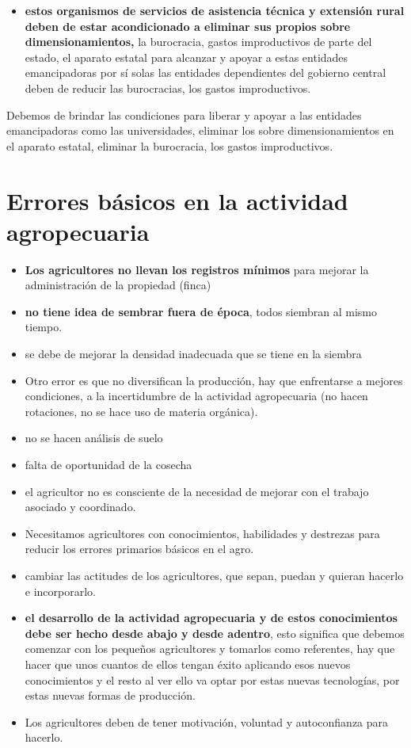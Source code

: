 \documentclass[
  a4paper,
]{article}
\providecommand{\tightlist}{%
  \setlength{\itemsep}{0pt}\setlength{\parskip}{0pt}}\usepackage{longtable,booktabs,array}
\begin{document}
\begin{itemize}
\tightlist
\item
  \textbf{estos organismos de servicios de asistencia técnica y
  extensión rural deben de estar acondicionado a eliminar sus propios
  sobre dimensionamientos,} la burocracia, gastos improductivos de parte
  del estado, el aparato estatal para alcanzar y apoyar a estas
  entidades emancipadoras por sí solas las entidades dependientes del
  gobierno central deben de reducir las burocracias, los gastos
  improductivos.
\end{itemize}

Debemos de brindar las condiciones para liberar y apoyar a las entidades
emancipadoras como las universidades, eliminar los sobre
dimensionamientos en el aparato estatal, eliminar la burocracia, los
gastos improductivos.

\hypertarget{errores-buxe1sicos-en-la-actividad-agropecuaria}{%
\section{Errores básicos en la actividad
agropecuaria}\label{errores-buxe1sicos-en-la-actividad-agropecuaria}}

\begin{itemize}
\item
  \textbf{Los agricultores no llevan los registros mínimos} para mejorar
  la administración de la propiedad (finca)
\item
  \textbf{no tiene idea de sembrar fuera de época}, todos siembran al
  mismo tiempo.
\item
  se debe de mejorar la densidad inadecuada que se tiene en la siembra
\item
  Otro error es que no diversifican la producción, hay que enfrentarse a
  mejores condiciones, a la incertidumbre de la actividad agropecuaria
  (no hacen rotaciones, no se hace uso de materia orgánica).
\item
  no se hacen análisis de suelo
\item
  falta de oportunidad de la cosecha
\item
  el agricultor no es consciente de la necesidad de mejorar con el
  trabajo asociado y coordinado.
\item
  Necesitamos agricultores con conocimientos, habilidades y destrezas
  para reducir los errores primarios básicos en el agro.
\item
  cambiar las actitudes de los agricultores, que sepan, puedan y quieran
  hacerlo e incorporarlo.
\item
  \textbf{el desarrollo de la actividad agropecuaria y de estos
  conocimientos debe ser hecho desde abajo y desde adentro}, esto
  significa que debemos comenzar con los pequeños agricultores y
  tomarlos como referentes, hay que hacer que unos cuantos de ellos
  tengan éxito aplicando esos nuevos conocimientos y el resto al ver
  ello va optar por estas nuevas tecnologías, por estas nuevas formas de
  producción.
\item
  Los agricultores deben de tener motivación, voluntad y autoconfianza
  para hacerlo.
\end{itemize}
\end{document}
